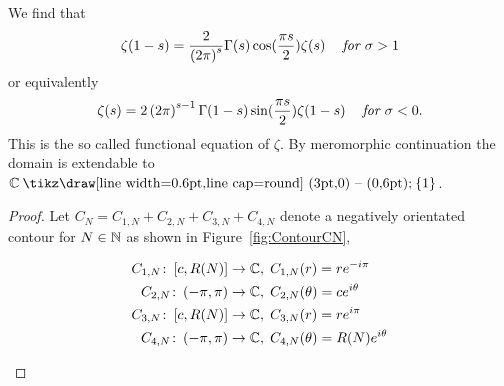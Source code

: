 \begin{theorem}
	We find that
\begin{equation}
	\zeta(1 - s) = \frac{2}{\left(2 \pi\right)^s} \Gamma(s) \cos(\frac{\pi s}{2}) \zeta(s) \hspace{0.3cm} \textit{ for } \sigma > 1
\end{equation}
	or equivalently
\begin{equation}
	\zeta(s) = 2\left(2 \pi\right)^{s - 1} \Gamma(1 - s) \sin(\frac{\pi s}{2}) \zeta(1 - s) \hspace{0.3cm} \textit{ for } \sigma < 0.
\end{equation}
	This is the so called functional equation of $\zeta$. By meromorphic continuation the domain is extendable to $\field{C} \mysetminus \fbr{1}$.
\end{theorem}
\begin{proof}
	Let $C_N = C_{1,N} + C_{2,N} + C_{3,N} + C_{4,N}$ denote a negatively orientated contour for $N \in \mathbb{N}$ as shown in Figure~\ref{fig:ContourCN},
\begin{figure}[!htb]
\begin{minipage}[c]{0.55\textwidth}
\centering
\begin{equation*}
\begin{aligned}
	C_{1,N} \colon \left[c, R(N)\right] &\to \mathbb{C}, \; C_{1,N}(r) = r e^{-i \pi} \\
	C_{2,N} \colon \left(-\pi, \pi\right) &\to \mathbb{C}, \; C_{2,N}(\theta) = c e^{i \theta} \\
	C_{3,N} \colon \left[c, R(N)\right] &\to \mathbb{C}, \; C_{3,N}(r) = r e^{i \pi} \\
	C_{4,N} \colon \left(-\pi, \pi\right) &\to \mathbb{C}, \; C_{4,N}(\theta) = R(N) e^{i \theta}
\end{aligned}
\end{equation*}
\end{minipage}
\begin{minipage}[c]{0.45\textwidth}
\raggedleft
{}
\end{minipage}
\end{figure}
\end{proof}
